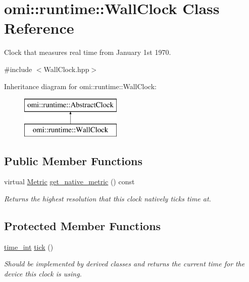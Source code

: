 \hypertarget{classomi_1_1runtime_1_1_wall_clock}{}\section{omi\+:\+:runtime\+:\+:Wall\+Clock Class Reference}
\label{classomi_1_1runtime_1_1_wall_clock}


Clock that measures real time from January 1st 1970.  




{\ttfamily \#include $<$Wall\+Clock.\+hpp$>$}

Inheritance diagram for omi\+:\+:runtime\+:\+:Wall\+Clock\+:\begin{figure}[H]
\begin{center}
\leavevmode
\includegraphics[height=2.000000cm]{classomi_1_1runtime_1_1_wall_clock}
\end{center}
\end{figure}
\subsection*{Public Member Functions}
\begin{DoxyCompactItemize}
\item 
virtual \hyperlink{classomi_1_1runtime_1_1_abstract_clock_a6af6e30a02165469ffcdcbd512d47a1b}{Metric} \hyperlink{classomi_1_1runtime_1_1_wall_clock_a275514a3171792b2067eda5cfac9490d}{get\+\_\+native\+\_\+metric} () const \hypertarget{classomi_1_1runtime_1_1_wall_clock_a275514a3171792b2067eda5cfac9490d}{}\label{classomi_1_1runtime_1_1_wall_clock_a275514a3171792b2067eda5cfac9490d}

\begin{DoxyCompactList}\small\item\em Returns the highest resolution that this clock natively ticks time at. \end{DoxyCompactList}\end{DoxyCompactItemize}
\subsection*{Protected Member Functions}
\begin{DoxyCompactItemize}
\item 
\hyperlink{classomi_1_1runtime_1_1_abstract_clock_af2122541388aea885afc08e8135340f7}{time\+\_\+int} \hyperlink{classomi_1_1runtime_1_1_wall_clock_a3a7252baf0bd82141aeb60e2303fb56a}{tick} ()
\begin{DoxyCompactList}\small\item\em Should be implemented by derived classes and returns the current time for the device this clock is using. \end{DoxyCompactList}\end{DoxyCompactItemize}
